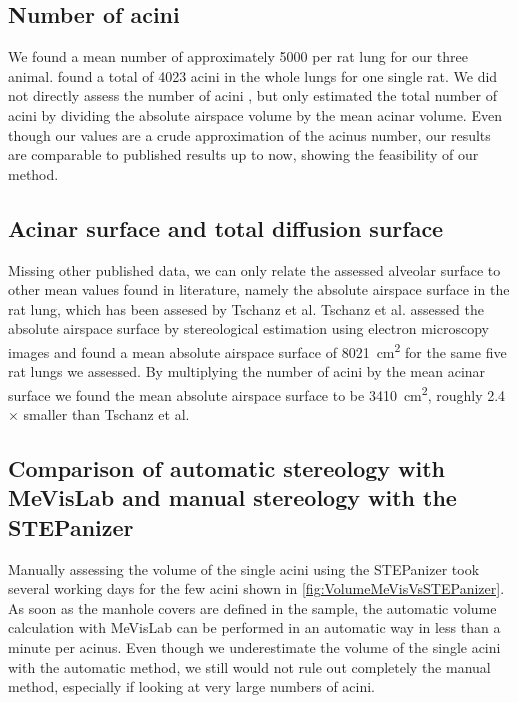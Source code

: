 \documentclass[twoside,paper=a4,abstract=true,english,DIVcalc]{scrartcl}
\begin{document}
\subsection{Number of acini}
We found a mean number of approximately 5000 per rat lung for our three animal. \citet[page 146]{Rodriguez1987} found a total of 4023 acini in the whole lungs for one single rat. We did not directly assess the number of acini , but only estimated the total number of acini by dividing the absolute airspace volume  by the mean acinar volume. Even though our values are a crude approximation of the acinus number, our results are comparable to published results up to now, showing the feasibility of our method.

\subsection{Acinar surface and total diffusion surface}
Missing other published data, we can only relate the assessed alveolar surface to other mean values found in literature, namely the absolute airspace surface in the rat lung, which has been assesed by Tschanz et al. Tschanz et al. assessed the absolute airspace surface by stereological estimation using electron microscopy images and found a mean absolute airspace surface of \SI{8021}{\centi\metre\squared} for the same five rat lungs we assessed. By multiplying the number of acini by the mean acinar surface we found the mean absolute airspace surface to be \SI{3410}{\centi\metre\squared}, roughly 2.4\(\times\) smaller than Tschanz et al.

\subsection[Comparison of MeVisLab with STEPanizer]{Comparison of automatic stereology with MeVisLab and manual stereology with the STEPanizer}
Manually assessing the volume of the single acini using the STEPanizer took several working days for the few acini shown in \autoref{fig:VolumeMeVisVsSTEPanizer}. As soon as the manhole covers are defined in the sample, the automatic volume calculation with MeVisLab can be performed in an automatic way in less than a minute per acinus. Even though we underestimate the volume of the single acini with the automatic method, we still would not rule out completely the manual method, especially if looking at very large numbers of acini.
\end{document}
